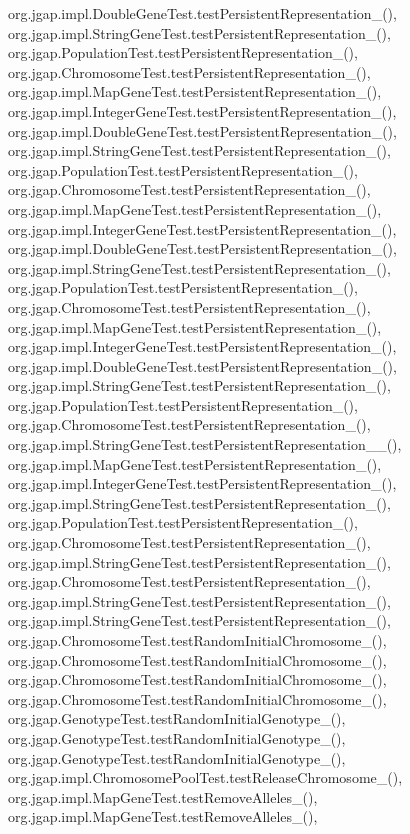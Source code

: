 org.\-jgap.\-impl.\-Double\-Gene\-Test.\-test\-Persistent\-Representation\-\_(), org.\-jgap.\-impl.\-String\-Gene\-Test.\-test\-Persistent\-Representation\-\_(), org.\-jgap.\-Population\-Test.\-test\-Persistent\-Representation\-\_(), org.\-jgap.\-Chromosome\-Test.\-test\-Persistent\-Representation\-\_(), org.\-jgap.\-impl.\-Map\-Gene\-Test.\-test\-Persistent\-Representation\-\_(), org.\-jgap.\-impl.\-Integer\-Gene\-Test.\-test\-Persistent\-Representation\-\_(), org.\-jgap.\-impl.\-Double\-Gene\-Test.\-test\-Persistent\-Representation\-\_(), org.\-jgap.\-impl.\-String\-Gene\-Test.\-test\-Persistent\-Representation\-\_(), org.\-jgap.\-Population\-Test.\-test\-Persistent\-Representation\-\_(), org.\-jgap.\-Chromosome\-Test.\-test\-Persistent\-Representation\-\_(), org.\-jgap.\-impl.\-Map\-Gene\-Test.\-test\-Persistent\-Representation\-\_(), org.\-jgap.\-impl.\-Integer\-Gene\-Test.\-test\-Persistent\-Representation\-\_(), org.\-jgap.\-impl.\-Double\-Gene\-Test.\-test\-Persistent\-Representation\-\_(), org.\-jgap.\-impl.\-String\-Gene\-Test.\-test\-Persistent\-Representation\-\_(), org.\-jgap.\-Population\-Test.\-test\-Persistent\-Representation\-\_(), org.\-jgap.\-Chromosome\-Test.\-test\-Persistent\-Representation\-\_(), org.\-jgap.\-impl.\-Map\-Gene\-Test.\-test\-Persistent\-Representation\-\_(), org.\-jgap.\-impl.\-Integer\-Gene\-Test.\-test\-Persistent\-Representation\-\_(), org.\-jgap.\-impl.\-Double\-Gene\-Test.\-test\-Persistent\-Representation\-\_(), org.\-jgap.\-impl.\-String\-Gene\-Test.\-test\-Persistent\-Representation\-\_(), org.\-jgap.\-Population\-Test.\-test\-Persistent\-Representation\-\_(), org.\-jgap.\-Chromosome\-Test.\-test\-Persistent\-Representation\-\_(), org.\-jgap.\-impl.\-String\-Gene\-Test.\-test\-Persistent\-Representation\-\_\-\_(), org.\-jgap.\-impl.\-Map\-Gene\-Test.\-test\-Persistent\-Representation\-\_(), org.\-jgap.\-impl.\-Integer\-Gene\-Test.\-test\-Persistent\-Representation\-\_(), org.\-jgap.\-impl.\-String\-Gene\-Test.\-test\-Persistent\-Representation\-\_(), org.\-jgap.\-Population\-Test.\-test\-Persistent\-Representation\-\_(), org.\-jgap.\-Chromosome\-Test.\-test\-Persistent\-Representation\-\_(), org.\-jgap.\-impl.\-String\-Gene\-Test.\-test\-Persistent\-Representation\-\_(), org.\-jgap.\-Chromosome\-Test.\-test\-Persistent\-Representation\-\_(), org.\-jgap.\-impl.\-String\-Gene\-Test.\-test\-Persistent\-Representation\-\_(), org.\-jgap.\-impl.\-String\-Gene\-Test.\-test\-Persistent\-Representation\-\_(), org.\-jgap.\-Chromosome\-Test.\-test\-Random\-Initial\-Chromosome\-\_(), org.\-jgap.\-Chromosome\-Test.\-test\-Random\-Initial\-Chromosome\-\_(), org.\-jgap.\-Chromosome\-Test.\-test\-Random\-Initial\-Chromosome\-\_(), org.\-jgap.\-Chromosome\-Test.\-test\-Random\-Initial\-Chromosome\-\_(), org.\-jgap.\-Genotype\-Test.\-test\-Random\-Initial\-Genotype\-\_(), org.\-jgap.\-Genotype\-Test.\-test\-Random\-Initial\-Genotype\-\_(), org.\-jgap.\-Genotype\-Test.\-test\-Random\-Initial\-Genotype\-\_(), org.\-jgap.\-impl.\-Chromosome\-Pool\-Test.\-test\-Release\-Chromosome\-\_(), org.\-jgap.\-impl.\-Map\-Gene\-Test.\-test\-Remove\-Alleles\-\_(), org.\-jgap.\-impl.\-Map\-Gene\-Test.\-test\-Remove\-Alleles\-\_(), 